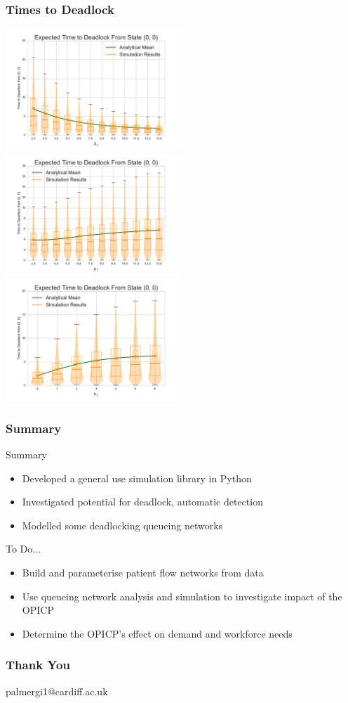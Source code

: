 \documentclass[xcolor={table}]{beamer}
\begin{document}
\begin{frame}
    \frametitle{Times to Deadlock}
    \includegraphics[width=0.5\textwidth]{vary_L1fb}
    \includegraphics[width=0.5\textwidth]{vary_mu1fb}\newline
    \centering
    \includegraphics[width=0.5\textwidth]{vary_n1fb}
\end{frame}

\begin{frame}
\frametitle{Summary}
\begin{block}{Summary}
\begin{itemize}
\item Developed a general use simulation library in Python
\item Investigated potential for deadlock, automatic detection
\item Modelled some deadlocking queueing networks
\end{itemize}
\end{block}

\begin{block}{To Do...}
\begin{itemize}
\item Build and parameterise patient flow networks from data
\item Use queueing network analysis and simulation to investigate impact of the OPICP
\item Determine the OPICP's effect on demand and workforce needs
\end{itemize}
\end{block}
\end{frame}


\begin{frame}
    \frametitle{Thank You}
    palmergi1@cardiff.ac.uk
\end{frame}
\end{document}

